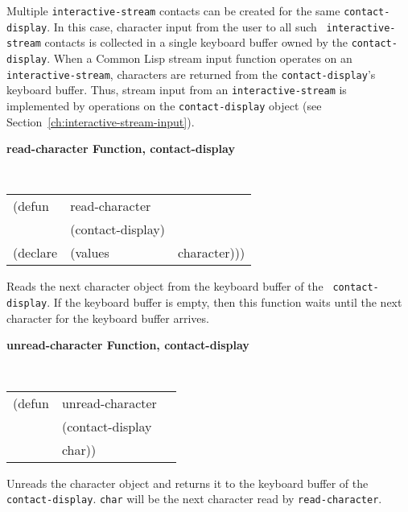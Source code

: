 Multiple {\tt interactive-stream} contacts can be created for the same
{\tt contact-display}. In
this case, character input from the user to all such {\tt
interactive-stream} contacts is collected in a single keyboard
buffer owned by the {\tt contact-display}. When a Common Lisp stream input
function operates on an {\tt interactive-stream}, characters are returned from
the {\tt contact-display}'s keyboard buffer. Thus,
stream input from an {\tt interactive-stream} is implemented by operations on the
{\tt contact-display} object (see Section~\ref{ch:interactive-stream-input}).

{\samepage
{\large {\bf read-character \hfill Function, contact-display}}
\begin{flushright} \parbox[t]{6.125in}{
\tt
\begin{tabular}{lll}
\raggedright
(defun & read-character & \\
& (contact-display)\\
(declare &(values &character)))
\end{tabular}
\rm

}\end{flushright}}

\begin{flushright} \parbox[t]{6.125in}{
Reads the next character object from the keyboard buffer of the {\tt
contact-display}. If the keyboard buffer is empty, then this function
waits until the next character for the keyboard buffer arrives.

}\end{flushright}


{\samepage
{\large {\bf unread-character \hfill Function, contact-display}}
\begin{flushright} \parbox[t]{6.125in}{
\tt
\begin{tabular}{lll}
\raggedright
(defun & unread-character & \\
& (contact-display\\
& char))
\end{tabular}
\rm

}\end{flushright}}

\begin{flushright} \parbox[t]{6.125in}{
Unreads the character object and returns it to the keyboard buffer of the
{\tt contact-display}. {\tt char} will be the next
character read by {\tt read-character}.

}\end{flushright}


